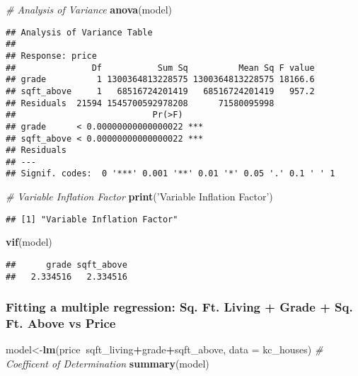 \documentclass[]{article}
\newenvironment{Shaded}{\begin{snugshade}}{\end{snugshade}}
\newcommand{\CommentTok}[1]{\textcolor[rgb]{0.56,0.35,0.01}{\textit{#1}}}
\newcommand{\DataTypeTok}[1]{\textcolor[rgb]{0.13,0.29,0.53}{#1}}
\newcommand{\KeywordTok}[1]{\textcolor[rgb]{0.13,0.29,0.53}{\textbf{#1}}}
\newcommand{\NormalTok}[1]{#1}
\newcommand{\OperatorTok}[1]{\textcolor[rgb]{0.81,0.36,0.00}{\textbf{#1}}}
\newcommand{\StringTok}[1]{\textcolor[rgb]{0.31,0.60,0.02}{#1}}
\begin{document}
\begin{Shaded}
\begin{Highlighting}[]
\CommentTok{# Analysis of Variance}
\KeywordTok{anova}\NormalTok{(model)}
\end{Highlighting}
\end{Shaded}

\begin{verbatim}
## Analysis of Variance Table
## 
## Response: price
##               Df           Sum Sq          Mean Sq F value
## grade          1 1300364813228575 1300364813228575 18166.6
## sqft_above     1   68516724201419   68516724201419   957.2
## Residuals  21594 1545700592978208      71580095998        
##                           Pr(>F)    
## grade      < 0.00000000000000022 ***
## sqft_above < 0.00000000000000022 ***
## Residuals                           
## ---
## Signif. codes:  0 '***' 0.001 '**' 0.01 '*' 0.05 '.' 0.1 ' ' 1
\end{verbatim}

\begin{Shaded}
\begin{Highlighting}[]
\CommentTok{# Variable Inflation Factor}
\KeywordTok{print}\NormalTok{(}\StringTok{'Variable Inflation Factor'}\NormalTok{)}
\end{Highlighting}
\end{Shaded}

\begin{verbatim}
## [1] "Variable Inflation Factor"
\end{verbatim}

\begin{Shaded}
\begin{Highlighting}[]
\KeywordTok{vif}\NormalTok{(model)}
\end{Highlighting}
\end{Shaded}

\begin{verbatim}
##      grade sqft_above 
##   2.334516   2.334516
\end{verbatim}

\hypertarget{fitting-a-multiple-regression-sq.-ft.-living-grade-sq.-ft.-above-vs-price}{%
\subsubsection{Fitting a multiple regression: Sq. Ft. Living + Grade +
Sq. Ft. Above vs
Price}\label{fitting-a-multiple-regression-sq.-ft.-living-grade-sq.-ft.-above-vs-price}}

\begin{Shaded}
\begin{Highlighting}[]
\NormalTok{model<-}\KeywordTok{lm}\NormalTok{(price}\OperatorTok{~}\NormalTok{sqft_living}\OperatorTok{+}\NormalTok{grade}\OperatorTok{+}\NormalTok{sqft_above, }\DataTypeTok{data =}\NormalTok{ kc_houses)}
\CommentTok{# Coefficent of Determination}
\KeywordTok{summary}\NormalTok{(model)}
\end{Highlighting}
\end{Shaded}
\end{document}
